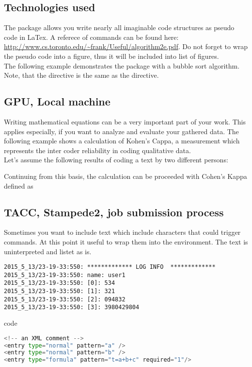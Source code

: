 \subsection{Technologies used}


The package  allows you write nearly all imaginable code structures as pseudo code in LaTex. A referece of commands can be found here: \url{http://www.cs.toronto.edu/~frank/Useful/algorithm2e.pdf}. Do not forget to wrap the pseudo code into a figure, thus it will be included into list of figures.\\

The following example demonstrates the package with a bubble sort algorithm. Note, that the directive  is the same as the  directive.


\newpage
\subsection{GPU, Local machine}

Writing mathematical equations can be a very important part of your work. This applies especially, if you want to analyze and evaluate your gathered data. The following example shows a calculation of Kohen's Cappa, a measurement which represents the inter coder reliability in coding qualitative data.\\

Let's assume the following results of coding a text by two different persons:


Continuing from this basis, the calculation can be proceeded with Cohen's Kappa defined as


\subsection{TACC, Stampede2, job submission process}

Sometimes you want to include text which include characters that could trigger commands. At this point it useful to wrap them into the  environment. The text is uninterpreted and listet as is.

\scriptsize
\begin{verbatim}
2015_5_13/23-19-33:550: ************* LOG INFO  *************
2015_5_13/23-19-33:550: name: user1
2015_5_13/23-19-33:550: [0]: 534
2015_5_13/23-19-33:550: [1]: 321
2015_5_13/23-19-33:550: [2]: 094832
2015_5_13/23-19-33:550: [3]: 3980429804
\end{verbatim}
\normalsize	

code


\small
\begin{lstlisting}[keywordstyle=\color{blue},language=Python]
<!-- an XML comment -->
<entry type="normal" pattern="a" />
<entry type="normal" pattern="b" />
<entry type="formula" pattern="t=a+b+c" required="1"/>
\end{lstlisting}
\normalsize	